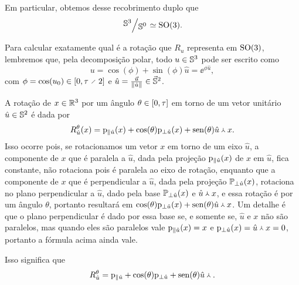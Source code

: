 Em particular, obtemos desse recobrimento duplo que
	\begin{equation*}
	\quo{\S^3}{\S^0} \simeq \SO(3).
	\end{equation*}

Para calcular exatamente qual é a rotação que $R_u$ representa em $\SO(3)$, lembremos que, pela decomposição polar, todo $u \in \S^3$ pode ser escrito como
	\begin{equation*}
	u = \cos(\phi) + \sin(\phi)\hat{u} = \ee^{\phi \hat{u}},
	\end{equation*}
com $\phi = \cos(\esc{u}) \in \intff{0}{\tau \div 2}$ e $\hat{u} = \frac{\vec{u}}{\nor{\hat{u}}} \in \vec{\S}^2$.

A rotação de $x \in \R^3$ por um ângulo $\theta \in \intff{0}{\tau}$ em torno de um vetor unitário $\hat{u} \in \S^2$ é dada por
	\begin{equation*}
	R^{\theta}_{\hat{u}}(x) = \proj_{\parallel \hat{u}}(x) + \cos(\theta) \proj_{\perp \hat{u}}(x) + \sin(\theta) \pvec{\hat{u}}{x}.
	\end{equation*}
Isso ocorre pois, se rotacionamos um vetor $x$ em torno de um eixo $\hat{u}$, a componente de $x$ que é paralela a $\hat{u}$, dada pela projeção $\proj_{\parallel \hat{u}}(x)$ de $x$ em $\hat{u}$, fica constante, não rotaciona pois é paralela ao eixo de rotação, enquanto que a componente de $x$ que é perpendicular a $\hat{u}$, dada pela projeção $\pro_{\perp \hat{u}}(x)$, rotaciona no plano perpendicular a $\hat{u}$, dado pela base $\pro_{\perp \hat{u}}(x)$ e $\pvec{\hat{u}}{x}$, e essa rotação é por um ângulo $\theta$, portanto resultará em $\cos(\theta) \proj_{\perp \hat{u}}(x) + \sin(\theta) \pvec{\hat{u}}{x}$. Um detalhe é que o plano perpendicular é dado por essa base se, e somente se, $\hat{u}$ e $x$ não são paralelos, mas quando eles são paralelos vale $\proj_{\parallel \hat{u}}(x)=x$ e $\proj_{\perp \hat{u}}(x) = \pvec{\hat{u}}{x} = 0$, portanto a fórmula acima ainda vale.

Isso significa que
	\begin{equation*}
	R^{\theta}_{\hat{u}} = \proj_{\parallel \hat{u}} + \cos(\theta) \proj_{\perp \hat{u}} + \sin(\theta){ \pvec{\hat{u}}{}} .
	\end{equation*}

